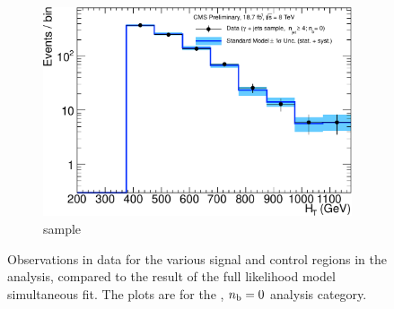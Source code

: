 \begin{figure}[h!]
\begin{subfigure}[b]{0.48\textwidth}
    \includegraphics[width=\textwidth]
    {Figs/results/v0/blueBand/single_plots/photon_0b_ge4j_logy.pdf}
    \caption{\gj sample}
  \end{subfigure}
  \caption{Observations in data for the various signal and control
  regions in the analysis, compared to the result of the full likelihood model
  simultaneous fit. The plots are for the \njhigh, $n_{\text{b}} = 0$ analysis category.}
  \label{fig:blue_fits_0b_ge4j}
\end{figure}

